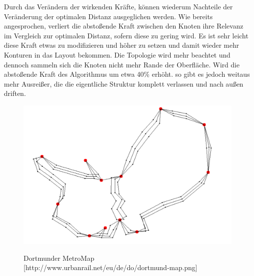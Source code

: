 Durch das Verändern der wirkenden Kräfte, können wiederum Nachteile der Veränderung der optimalen Distanz ausgeglichen werden. Wie bereits angesprochen, verliert die abstoßende Kraft zwischen den Knoten ihre Relevanz im Vergleich zur optimalen Distanz, sofern diese zu gering wird. Es ist sehr leicht diese Kraft etwas zu modifizieren und höher zu setzen und damit wieder mehr Konturen in das Layout bekommen. Die Topologie wird mehr beachtet und dennoch sammeln sich die Knoten nicht mehr Rande der Oberfläche. Wird die abstoßende Kraft des Algorithmus um etwa 40\% erhöht. so gibt es jedoch weitaus mehr Ausreißer, die die eigentliche Struktur komplett verlassen und nach außen driften. \\
\begin{figure}[t]
\centering
{\includegraphics[scale=0.5]{bilder/graphfertig}\label{fig_dortmundmap}
}\\
\caption[Dortmunder MetroMap]{Dortmunder MetroMap [http://www.urbanrail.net/eu/de/do/dortmund-map.png]}
\label{fig_dortmundmap}
\end{figure}
